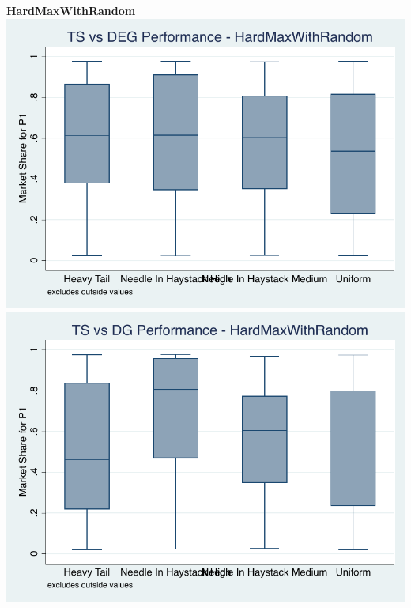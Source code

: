 \documentclass[11pt,letterpaper]{article}
\begin{document}
\pagebreak
\textbf{HardMaxWithRandom} \\
\includegraphics[scale=1]{hmr_ts_deg_prior} \\
\includegraphics[scale=1]{hmr_ts_dg_prior}
\end{document}
